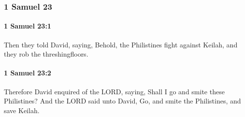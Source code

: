 	\subsubsection{1 Samuel 23} %
		\label{1SAMUEL-23}

		\paragraph{1 Samuel 23:1} %
			\label{1SAMUEL-23-1}

			Then they told David, saying, Behold, the Philistines fight against Keilah, and they rob the threshingfloors.


		\paragraph{1 Samuel 23:2} %
			\label{1SAMUEL-23-2}

			Therefore David enquired of the LORD, saying, Shall I go and smite these Philistines? And the LORD said unto David, Go, and smite the Philistines, and save Keilah.

